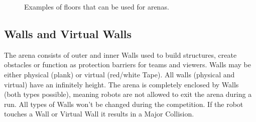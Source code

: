 \begin{figure} [h!]
\begin{center}
		 \hspace{0.1cm}
		 \hspace{0.1cm}
		 \hspace{0.1cm}
		 \hspace{0.1cm}
	\end{center}
	\caption{Examples of floors that can be used for \RCAW arenas.}
	\label{fig:example_floors}
\end{figure}





\subsection{Walls and Virtual Walls}
\label{subsec: Walls and virtual Walls}

The arena consists of outer and inner Walls used to build structures, create obstacles or function as protection barriers for teams and viewers. Walls may be either physical (plank) or virtual (red/white Tape). All walls (physical and virtual) have an infinitely height.
The arena is completely enclosed by Walls (both types possible), meaning robots are not allowed to exit the arena during a run. All types of Walls won't be changed during the competition. If the robot touches a Wall or Virtual Wall it results in a Major Collision.


